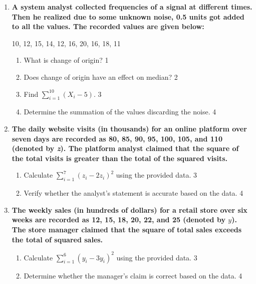 \documentclass[a4paper,oneside]{book}
\begin{document}
\begin{enumerate}

     \item
	  \textbf{A system analyst collected frequencies of a signal at different times. Then he realized due to some unknown noise, 0.5 units got added to all the values. The recorded values are given below:} 
	  
	  \begin{center}
	  10, 12, 15, 14, 12, 16, 20, 16, 18, 11
	  \end{center}
  
  \begin{enumerate}
    \item
	What is change of origin? \hfill 1
    \item
	Does change of origin have an effect on median? \hfill 2
    \item  
	Find $\displaystyle \sum_{i=1}^{10} (X_i-5)$. \hfill 3
    \item
	Determine the summation of the values discarding the noise. \hfill 4
  \end{enumerate}
  
  \item  
\textbf{The daily website visits (in thousands) for an online platform over seven days are recorded as 80, 85, 90, 95, 100, 105, and 110 (denoted by \textit{z}). The platform analyst claimed that the square of the total visits is greater than the total of the squared visits.}

\begin{enumerate}
    \item  
    Calculate $\displaystyle \sum_{i=1}^7 (z_i - 2z_i)^2$ using the provided data. \hfill 3
    \item
    Verify whether the analyst’s statement is accurate based on the data. \hfill 4
\end{enumerate}

\item
\textbf{The weekly sales (in hundreds of dollars) for a retail store over six weeks are recorded as 12, 15, 18, 20, 22, and 25 (denoted by \( y \)). The store manager claimed that the square of total sales exceeds the total of squared sales.}

\begin{enumerate}
    \item
    Calculate $\displaystyle \sum_{i=1}^6 (y_i - 3y_i)^2$ using the provided data. \hfill 3
    
    \item
    Determine whether the manager’s claim is correct based on the data. \hfill 4
\end{enumerate}
  

\end{enumerate}
\end{document}
